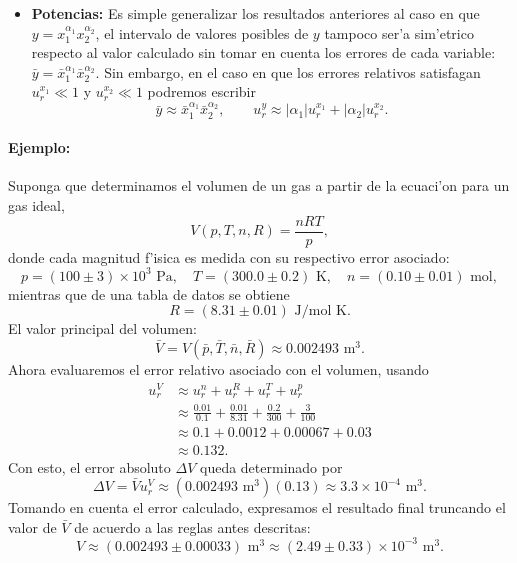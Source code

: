 \begin{itemize}
\item \textbf{Potencias:} Es simple generalizar los resultados anteriores al caso en que $y=x_1^{\alpha_1} x_2^{\alpha_2}$, el intervalo de valores posibles de $y$ tampoco ser'a sim'etrico respecto al valor calculado sin tomar en cuenta los errores de cada variable: $\bar{y}=\bar{x}_1^{\alpha_1}\bar{x}_2^{\alpha_2}$. Sin embargo, en el caso en que los errores relativos satisfagan $u_r^{x_1}\ll 1$ y $u_r^{x_2}\ll 1$ podremos escribir
\begin{equation}
\bar{y}\approx \bar{x}_1^{\alpha_1}\bar{x}_2^{\alpha_2}, \qquad  u_r^{y} \approx  |\alpha_1|u_r^{x_1} + |\alpha_2|u_r^{x_2}.
\end{equation}
\end{itemize}


\paragraph{Ejemplo:}
 Suponga que determinamos el volumen de un gas a partir de la ecuaci'on para un gas ideal,
\begin{equation}
V(p,T,n,R)=\frac{nRT}{p},
\end{equation}
donde cada magnitud f'isica es medida con su respectivo error asociado:
\begin{equation}
p=(100\pm 3)\times 10^3\text{ Pa}, \quad T=(300.0\pm 0.2)\text{ K}, 
\quad n=(0.10\pm 0.01)\text{ mol},
\end{equation}
mientras que de una tabla de datos se obtiene
\begin{equation}
R=(8.31\pm 0.01)\text{ J/mol K}.
\end{equation}
El valor principal del volumen:
\begin{equation}
\bar{V}= V(\bar{p},\bar{T},\bar{n},\bar{R}) \approx 0.002493\text{ m}^3.
\end{equation}
Ahora evaluaremos el error relativo asociado con el volumen, usando
\begin{align}
u_r^V &\approx u_r^n+ u_r^R + u_r^T + u_r^p \\
&\approx \frac{0.01}{0.1} + \frac{0.01}{8.31} + \frac{0.2}{300} + \frac{3}{100} \\
&\approx 0.1 + 0.0012 + 0.00067 + 0.03 \\
&\approx 0.132.
\end{align}
Con esto, el error absoluto $\Delta V$ queda determinado por
\begin{equation}
\Delta V = \bar{V}u_r^V \approx (0.002493\text{ m}^3)(0.13) \approx 3.3\times 10^{-4}\text{ m}^3.
\end{equation}
Tomando en cuenta el error calculado, expresamos el resultado final truncando el valor de $\bar{V}$ de acuerdo a las reglas antes descritas:
\begin{equation}
 V \approx (0.002493\pm 0.00033)\text{ m}^3 \approx (2.49\pm 0.33)\times 10^{-3}\text{ m}^3.
 \end{equation} 

